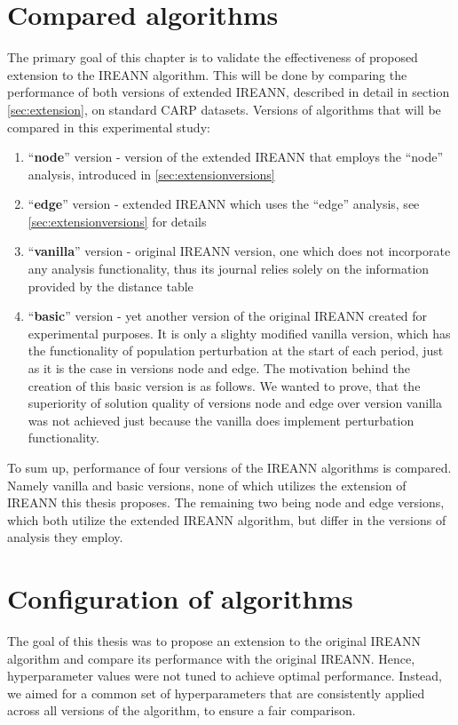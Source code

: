 \documentclass[twoside]{ctuthesis}
\theoremstyle{plain}
\theoremstyle{definition}
\theoremstyle{note}
\begin{document}
\section{Compared algorithms}
The primary goal of this chapter is to validate the effectiveness of proposed extension to the IREANN algorithm. This will be done by comparing the performance of both versions of extended IREANN, described in detail in section \ref{sec:extension}, on standard CARP datasets. 
Versions of algorithms that will be compared in this experimental study:
\begin{enumerate}
	\item ``\textbf{node}'' version - version of the extended IREANN that employs the ``node'' analysis, introduced in \ref{sec:extensionversions}
	\item ``\textbf{edge}'' version - extended IREANN which uses the ``edge'' analysis, see \ref{sec:extensionversions} for details
	\item ``\textbf{vanilla}'' version - original IREANN version, one which does not incorporate any analysis functionality, thus its journal relies solely on the information provided by the distance table
	\item ``\textbf{basic}'' version - yet another version of the original IREANN created for experimental purposes. It is only a slighty modified vanilla version, which has the functionality of population perturbation at the start of each period, just as it is the case in versions node and edge. The motivation behind the creation of this basic version is as follows. We wanted to prove, that the superiority of solution quality of versions node and edge over version vanilla was not achieved just because the vanilla does implement perturbation functionality.
\end{enumerate}

To sum up, performance of four versions of the IREANN algorithms is compared. Namely vanilla and basic versions, none of which utilizes the extension of IREANN this thesis proposes. The remaining two being node and edge versions, which both utilize the extended IREANN algorithm, but differ in the versions of analysis they employ.

\section{Configuration of algorithms}

The goal of this thesis was to propose an extension to the original IREANN algorithm and compare its performance with the original IREANN. Hence, hyperparameter values were not tuned to achieve optimal performance. Instead, we aimed for a common set of hyperparameters that are consistently applied across all versions of the algorithm, to ensure a fair comparison. 
\end{document}
